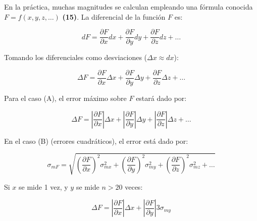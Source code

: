 \documentclass[12pt,a4paper]{article}
\begin{document}
En la práctica, muchas magnitudes se calculan empleando una fórmula conocida $F = f(x, y, z, \dots)$ \textbf{(15)}.
La diferencial de la función $F$ es:

\begin{equation}
dF = \frac{\partial F}{\partial x} dx + \frac{\partial F}{\partial y} dy + \frac{\partial F}{\partial z} dz + \dots \tag{16}
\end{equation}

Tomando los diferenciales como desviaciones ($\Delta x \approx dx$):

\begin{equation}
\Delta F = \frac{\partial F}{\partial x} \Delta x + \frac{\partial F}{\partial y} \Delta y + \frac{\partial F}{\partial z} \Delta z + \dots \tag{17}
\end{equation}

Para el caso (A), el error máximo sobre $F$ estará dado por:

\begin{equation}
\Delta F = \left| \frac{\partial F}{\partial x} \right| \Delta x + \left| \frac{\partial F}{\partial y} \right| \Delta y + \left| \frac{\partial F}{\partial z} \right| \Delta z + \dots \tag{18}
\end{equation}

En el caso (B) (errores cuadráticos), el error está dado por:

\begin{equation}
\sigma_{mF} = \sqrt{ \left( \frac{\partial F}{\partial x} \right)^2 \sigma_{mx}^2 + \left( \frac{\partial F}{\partial y} \right)^2 \sigma_{my}^2 + \left( \frac{\partial F}{\partial z} \right)^2 \sigma_{mz}^2 + \dots } \tag{19}
\end{equation}

Si $x$ se mide 1 vez, y $y$ se mide $n > 20$ veces:

\begin{equation}
\Delta F = \left| \frac{\partial F}{\partial x} \right| \Delta x + \left| \frac{\partial F}{\partial y} \right| 3\sigma_{my} \tag{20}
\end{equation}
\end{document}
